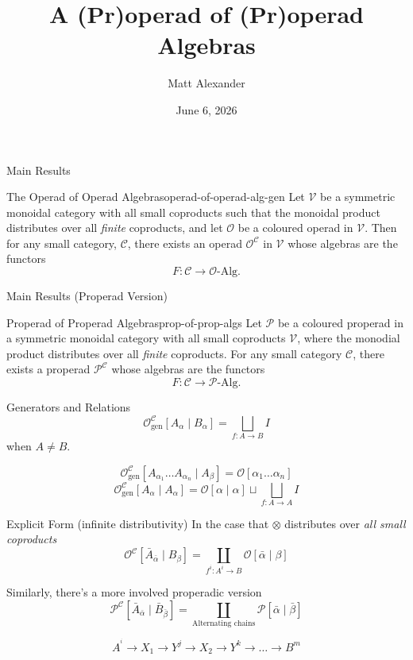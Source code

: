 \documentclass[presentation]{beamer}
\author{Matt Alexander}
\date{June 6, 2026}
\title{A (Pr)operad of (Pr)operad Algebras}
\begin{document}
\maketitle
\begin{frame}[label={sec:org76bac06}]{Main Results}
\begin{proposition}{The Operad of Operad Algebras}{operad-of-operad-alg-gen}
Let $\mathcal{V}$ be a symmetric monoidal category with all small coproducts such that the monoidal product distributes over all \emph{finite} coproducts, and let $\mathcal{O}$ be a coloured operad in $\mathcal{V}$. Then for any small category, $\mathcal{C}$, there exists an operad $\mathcal{O}^{\mathcal{C}}$ in $\mathcal{V}$ whose algebras are the functors 
\begin{equation*}
F: \mathcal{C} \to \mathcal{O} \text{-Alg}.
\end{equation*}
\end{proposition}
\end{frame}
\begin{frame}[label={sec:org55250ed}]{Main Results (Properad Version)}
\begin{proposition}{Properad of Properad Algebras}{prop-of-prop-algs}
Let $\mathcal{P}$ be a coloured properad in a symmetric monoidal category with all small coproducts $\mathcal{V}$, where the monodial product distributes over all \emph{finite} coproducts. For any small category $\mathcal{C}$, there exists a properad $\mathcal{P}^{\mathcal{C}}$ whose algebras are the functors
\begin{equation*}
F: \mathcal{C} \to \mathcal{P}\text{-Alg}.
\end{equation*}
\end{proposition}
\end{frame}
\begin{frame}[label={sec:orge55537a},fragile]{Generators and Relations}
\[
\mathcal{O}^{\mathcal{C}}_{\text{gen}}[A_{\alpha} \mid B_{\alpha}] = \bigsqcup_{f: A \to B} I
\]
when \(A \ne B\).

\[
\mathcal{O}^{\mathcal{C}}_{\text{gen}}[A_{\alpha_{1}} \ldots A_{\alpha_{n}} \mid A_{\beta}] = \mathcal{O}[\alpha_{1} \ldots \alpha_{n}]
\]
\[
\mathcal{O}^{\mathcal{C}}_{\text{gen}}[A_{\alpha} \mid A_{\alpha}] = \mathcal{O}[\alpha \mid \alpha] \sqcup \bigsqcup_{f: A \to A} I
\]
\end{frame}
\begin{frame}[label={sec:org6ddaed5}]{Explicit Form (infinite distributivity)}
In the case that \(\otimes\) distributes over \emph{all small coproducts}
\[
\mathcal{O}^{\mathcal{C}}[\bar{A}_{\bar{\alpha}} \mid B_{\beta}] = \coprod_{f^i: A^i \to B} \mathcal{O}[\bar{\alpha} \mid \beta]
\]
\bigskip

Similarly, there's a more involved properadic version
\[
\mathcal{P}^{\mathcal{C}}[\bar{A}_{\bar{\alpha}} \mid \bar{B}_{\bar{\beta}}] = \coprod_{\text{Alternating chains}} \mathcal{P}[\bar{\alpha} \mid \bar{\beta}]
\]

\[
A^{^{i}} \to X_{1} \to Y^{j} \to X_{2} \to Y^{k} \to \ldots \to B^{m}
\]
\end{frame}
\end{document}
